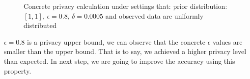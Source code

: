 \documentclass[sigconf, anonymous]{acmart}
\begin{document}
\begin{figure}
\begin{center}
\centering
\caption{Concrete privacy calculation under settings that: prior distribution:$[1,1]$, $\epsilon = 0.8$, $\delta = 0.0005$ and observed data are uniformly distributed}
\label{fig_privacy}
\end{center}
\end{figure}

$\epsilon = 0.8$ is a privacy upper bound, we can observe that the concrete $\epsilon$ values are smaller than the upper bound. That is to say, we achieved a higher privacy level than expected. In next step, we are going to improve the accuracy using this property.




\end{document}
